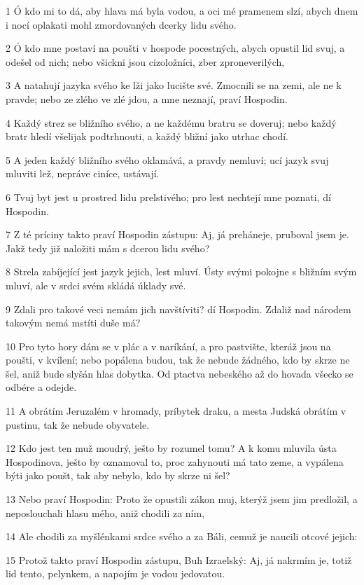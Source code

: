 \par 1 Ó kdo mi to dá, aby hlava má byla vodou, a oci mé pramenem slzí, abych dnem i nocí oplakati mohl zmordovaných dcerky lidu svého.
\par 2 Ó kdo mne postaví na poušti v hospode pocestných, abych opustil lid svuj, a odešel od nich; nebo všickni jsou cizoložníci, zber zproneverilých,
\par 3 A natahují jazyka svého ke lži jako lucište své. Zmocnili se na zemi, ale ne k pravde; nebo ze zlého ve zlé jdou, a mne neznají, praví Hospodin.
\par 4 Každý strez se bližního svého, a ne každému bratru se doveruj; nebo každý bratr hledí všelijak podtrhnouti, a každý bližní jako utrhac chodí.
\par 5 A jeden každý bližního svého oklamává, a pravdy nemluví; ucí jazyk svuj mluviti lež, nepráve ciníce, ustávají.
\par 6 Tvuj byt jest u prostred lidu prelstivého; pro lest nechtejí mne poznati, dí Hospodin.
\par 7 Z té príciny takto praví Hospodin zástupu: Aj, já preháneje, pruboval jsem je. Jakž tedy již naložiti mám s dcerou lidu svého?
\par 8 Strela zabíjející jest jazyk jejich, lest mluví. Ústy svými pokojne s bližním svým mluví, ale v srdci svém skládá úklady své.
\par 9 Zdali pro takové veci nemám jich navštíviti? dí Hospodin. Zdaliž nad národem takovým nemá mstíti duše má?
\par 10 Pro tyto hory dám se v plác a v naríkání, a pro pastvište, kteráž jsou na poušti, v kvílení; nebo popálena budou, tak že nebude žádného, kdo by skrze ne šel, aniž bude slyšán hlas dobytka. Od ptactva nebeského až do hovada všecko se odbére a odejde.
\par 11 A obrátím Jeruzalém v hromady, príbytek draku, a mesta Judská obrátím v pustinu, tak že nebude obyvatele.
\par 12 Kdo jest ten muž moudrý, ješto by rozumel tomu? A k komu mluvila ústa Hospodinova, ješto by oznamoval to, proc zahynouti má tato zeme, a vypálena býti jako poušt, tak aby nebylo, kdo by skrze ni šel?
\par 13 Nebo praví Hospodin: Proto že opustili zákon muj, kterýž jsem jim predložil, a neposlouchali hlasu mého, aniž chodili za ním,
\par 14 Ale chodili za myšlénkami srdce svého a za Báli, cemuž je naucili otcové jejich:
\par 15 Protož takto praví Hospodin zástupu, Buh Izraelský: Aj, já nakrmím je, totiž lid tento, pelynkem, a napojím je vodou jedovatou.
